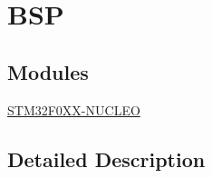 \hypertarget{group___b_s_p}{}\section{B\+SP}
\label{group___b_s_p}
\subsection*{Modules}
\begin{DoxyCompactItemize}
\item 
\hyperlink{group___s_t_m32_f0_x_x___n_u_c_l_e_o}{S\+T\+M32\+F0\+X\+X-\/\+N\+U\+C\+L\+EO}
\end{DoxyCompactItemize}


\subsection{Detailed Description}
